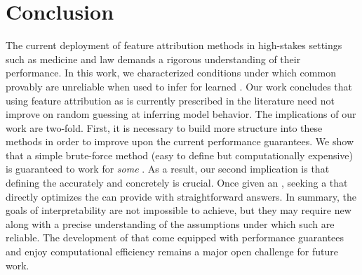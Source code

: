 \section{Conclusion}\label{sec:conclusion}


%
The current deployment of feature attribution methods in high-stakes settings such as medicine and law
demands a rigorous understanding of their performance.
In this work, we characterized conditions under which common \fielddefnames{} provably are unreliable when used to infer \behaviourname{} for learned \modelnames{}. Our work concludes that using feature attribution as is currently prescribed in the literature need not improve on random guessing at inferring model behavior.
The implications of our work are two-fold.
First, it is necessary to build more structure into these methods in order to improve upon the current performance guarantees. We show that a simple brute-force method (easy to define but computationally expensive) is guaranteed to work for \textit{some \downtasknames{}}.
As a result, our second implication is that defining the \downtaskname{} accurately and concretely is crucial. Once given an \downtaskname{}, seeking a \methodname{} that directly optimizes the \taskname{} can provide \usernames{} with straightforward answers. 
In summary, the goals of interpretability are not impossible to achieve, but they may require new \methodnames{} along with a precise understanding of the assumptions under which such \methodnames{} are reliable. 
%
The development of \methodnames{} that come equipped with performance guarantees and enjoy computational efficiency remains a major open challenge for future work.


\clearpage